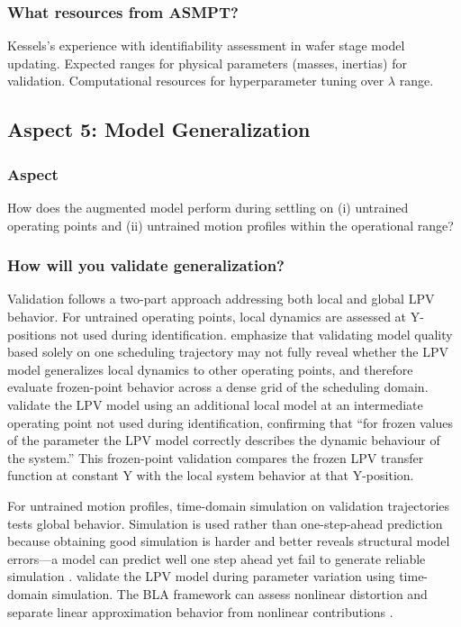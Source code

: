 \subsubsection{What resources from ASMPT?}

Kessels's experience with identifiability assessment in wafer stage model updating. Expected ranges for physical parameters (masses, inertias) for validation. Computational resources for hyperparameter tuning over $\lambda$ range.







\subsection{Aspect 5: Model Generalization}

\subsubsection*{Aspect}
How does the augmented model perform during settling on (i) untrained operating points and (ii) untrained motion profiles within the operational range?

\subsubsection{How will you validate generalization?}

Validation follows a two-part approach addressing both local and global LPV behavior. For untrained operating points, local dynamics are assessed at Y-positions not used during identification. \citet{bachnas2014review} emphasize that validating model quality based solely on one scheduling trajectory may not fully reveal whether the LPV model generalizes local dynamics to other operating points, and therefore evaluate frozen-point behavior across a dense grid of the scheduling domain. \citet{paijmans2008identification} validate the LPV model using an additional local model at an intermediate operating point not used during identification, confirming that ``for frozen values of the parameter the LPV model correctly describes the dynamic behaviour of the system.'' This frozen-point validation compares the frozen LPV transfer function at constant Y with the local system behavior at that Y-position.

For untrained motion profiles, time-domain simulation on validation trajectories tests global behavior. Simulation is used rather than one-step-ahead prediction because obtaining good simulation is harder and better reveals structural model errors---a model can predict well one step ahead yet fail to generate reliable simulation \citep{schoukens2019nonlinear}. \citet{paijmans2008identification} validate the LPV model during parameter variation using time-domain simulation. The BLA framework can assess nonlinear distortion and separate linear approximation behavior from nonlinear contributions \citep{schoukens2016linear}.

